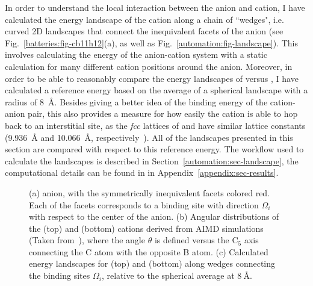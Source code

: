 \begin{refsection}

In order to understand the local interaction between the anion and cation, I have calculated the energy landscape of the cation along a chain of ``wedges", i.e. curved 2D landscapes that connect the inequivalent facets of the anion (see Fig.~\ref{batteries:fig-cb11h12}(a), as well as Fig.~\ref{automation:fig-landscape}). This involves calculating the energy of the anion-cation system with a static calculation for many different cation positions around the anion. Moreover, in order to be able to reasonably compare the energy landscapes of  versus , I have calculated a reference energy based on the average of a spherical landscape with a radius of 8~\si{\angstrom}. Besides giving a better idea of the binding energy of the cation-anion pair, this also provides a measure for how easily the cation is able to hop back to an interstitial site, as the \textit{fcc} lattices of  and  have similar lattice constants (9.936~\si{\angstrom} and 10.066~\si{\angstrom}, respectively~\cite{Tang2015}). All of the landscapes presented in this section are compared with respect to this reference energy. The workflow used to calculate the landscapes is described in Section~\ref{automation:sec-landscape}, the computational details can be found in  in Appendix~\ref{appendix:sec-results}.

{
\begin{figure}[ht]
\centering

\caption{(a) \ce{[CB11H12]^{-}} anion, with the symmetrically inequivalent facets colored red. Each of the facets corresponds to a binding site with direction $\Omega_i$ with respect to the center of the anion. (b) Angular distributions of the  (top) and  (bottom) cations derived from AIMD simulations (Taken from~\cite{Dimitrievska2018}), where the angle $\theta$ is defined versus the C$_5$ axis connecting the C atom with the opposite B atom. (c) Calculated energy landscapes for  (top) and  (bottom) along wedges connecting the binding sites $\Omega_i$, relative to the spherical average at $8~\si{\angstrom}$.}
\end{figure}
\label{batteries:fig-cb11h12}
}


\end{refsection}
